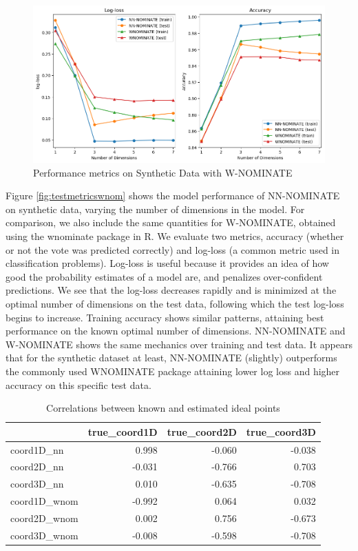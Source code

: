 \documentclass[11pt,]{article}
\begin{document}
\begin{figure}

{\centering \includegraphics[width=1\linewidth]{test_metrics_with_wnom}

}

\caption{\label{fig:testmetricswnom}Performance metrics on Synthetic Data with W-NOMINATE}\label{fig:unnamed-chunk-4}
\end{figure}

Figure \ref{fig:testmetricswnom} shows the model performance of
NN-NOMINATE on synthetic data, varying the number of dimensions in the
model. For comparison, we also include the same quantities for
W-NOMINATE, obtained using the wnominate package in R. We evaluate two
metrics, accuracy (whether or not the vote was predicted correctly) and
log-loss (a common metric used in classification problems). Log-loss is
useful because it provides an idea of how good the probability estimates
of a model are, and penalizes over-confident predictions. We see that
the log-loss decreases rapidly and is minimized at the optimal number of
dimensions on the test data, following which the test log-loss begins to
increase. Training accuracy shows similar patterns, attaining best
performance on the known optimal number of dimensions. NN-NOMINATE and
W-NOMINATE shows the same mechanics over training and test data. It
appears that for the synthetic dataset at least, NN-NOMINATE (slightly)
outperforms the commonly used WNOMINATE package attaining lower log loss
and higher accuracy on this specific test data.

\begin{table}

\caption{\label{tab:unnamed-chunk-6}\label{tab:corr}Correlations between known and estimated ideal points}
\centering
\begin{tabular}[t]{lrrr}
\toprule
  & true\_coord1D & true\_coord2D & true\_coord3D\\
\midrule
coord1D\_nn & 0.998 & -0.060 & -0.038\\
coord2D\_nn & -0.031 & -0.766 & 0.703\\
coord3D\_nn & 0.010 & -0.635 & -0.708\\
coord1D\_wnom & -0.992 & 0.064 & 0.032\\
coord2D\_wnom & 0.002 & 0.756 & -0.673\\
coord3D\_wnom & -0.008 & -0.598 & -0.708\\
\bottomrule
\end{tabular}
\end{table}
\end{document}
